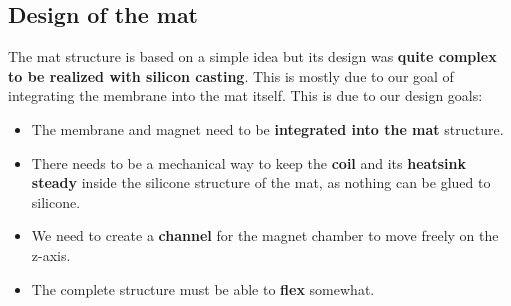 \subsection{Design of the mat}
The mat structure is based on a simple idea but its design was \textbf{quite complex to be realized with silicon casting}. This is mostly due to our goal of integrating the membrane into the mat itself.
This is due to our design goals:
\begin{itemize}
    \item The membrane and magnet need to be \textbf{integrated into the mat} structure.
    \item There needs to be a mechanical way to keep the \textbf{coil} and its \textbf{heatsink} \textbf{steady} inside the silicone structure of the mat, as nothing can be glued to silicone.
    \item We need to create a \textbf{channel} for the magnet chamber to move freely on the z-axis.
    \item The complete structure must be able to \textbf{flex} somewhat.
\end{itemize}

